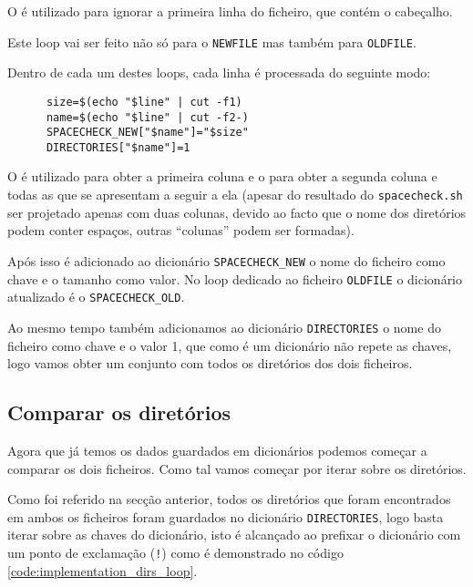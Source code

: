 O  é utilizado para ignorar a primeira linha do ficheiro,
que contém o cabeçalho.

Este loop vai ser feito não só para o \Verb|NEWFILE| mas também para
\Verb|OLDFILE|.

Dentro de cada um destes loops, cada linha é processada do seguinte modo:

\begin{listing}[H]
	\centering
	\begin{verbatim}
      size=$(echo "$line" | cut -f1)
      name=$(echo "$line" | cut -f2-)
      SPACECHECK_NEW["$name"]="$size"
      DIRECTORIES["$name"]=1
  \end{verbatim}
	\cprotect\caption{Processamento de uma linha do resutlado do \Verb|spacecheck.sh|}
\end{listing}

O  é utilizado para obter a primeira coluna e o
 para obter a segunda coluna e todas as que se apresentam a
seguir a ela (apesar do resultado do \Verb|spacecheck.sh| ser projetado apenas
com duas colunas, devido ao facto que o nome dos diretórios podem conter
espaços, outras \enquote{colunas} podem ser formadas).

Após isso é adicionado ao dicionário \Verb|SPACECHECK_NEW| o nome do ficheiro
como chave e o tamanho como valor. No loop dedicado ao ficheiro
\Verb|OLDFILE| o dicionário atualizado é o \Verb|SPACECHECK_OLD|.

Ao mesmo tempo também adicionamos ao dicionário \Verb|DIRECTORIES| o nome do
ficheiro como chave e o valor 1, que como é um dicionário não repete as chaves,
logo vamos obter um conjunto com todos os diretórios dos dois ficheiros.

\subsection{Comparar os diretórios}

Agora que já temos os dados guardados em dicionários podemos começar a comparar
os dois ficheiros. Como tal vamos começar por iterar sobre os diretórios.

Como foi referido na secção anterior, todos os diretórios que foram encontrados
em ambos os ficheiros foram guardados no dicionário \Verb|DIRECTORIES|, logo
basta iterar sobre as chaves do dicionário, isto é alcançado ao prefixar o
dicionário com um ponto de exclamação (\Verb|!|) como é demonstrado no código
\ref{code:implementation_dirs_loop}.

